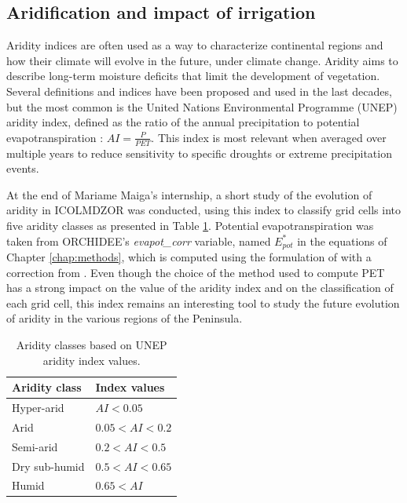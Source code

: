 \clearpage

\subsection{Aridification and impact of irrigation}

Aridity indices are often used as a way to characterize continental regions and how their climate will evolve in the future, under climate change. Aridity aims to describe long-term moisture deficits that limit the development of vegetation. Several definitions and indices have been proposed and used in the last decades, but the most common is the United Nations Environmental Programme (UNEP) aridity index, defined as the ratio of the annual precipitation to potential evapotranspiration : $AI = \frac{P}{PET}$. %
This index is most relevant when averaged over multiple years to reduce sensitivity to specific droughts or extreme precipitation events.

At the end of Mariame Maiga's internship, a short study of the evolution of aridity in ICOLMDZOR was conducted, using this index to classify grid cells into five aridity classes as presented in Table \ref{table:aridity_classes}. 
Potential evapotranspiration was taken from ORCHIDEE's \textit{evapot\_corr} variable, named $E_{pot}^*$ in the equations of Chapter \ref{chap:methods}, which is computed using the formulation of \citet{Budyko_1956} with a correction from \citet{milly_potential_1992}. 
Even though the choice of the method used to compute PET has a strong impact on the value of the aridity index and on the classification of each grid cell, this index remains an interesting tool to study the future evolution of aridity in the various regions of the Peninsula.

\begin{table}[h]
    \centering
    \begin{tabular}{|l|l|}
        \hline
        \textbf{Aridity class} & \textbf{Index values} \\
        \hline
        Hyper-arid & \( AI < 0.05 \) \\
        \hline
        Arid & \( 0.05 < AI < 0.2 \) \\
        \hline
        Semi-arid & \( 0.2 < AI < 0.5 \) \\
        \hline
        Dry sub-humid & \( 0.5 < AI < 0.65 \) \\
        \hline
        Humid & \( 0.65 < AI \) \\
        \hline
    \end{tabular}
    \caption{Aridity classes based on UNEP aridity index values.}
    \label{table:aridity_classes}
\end{table}

